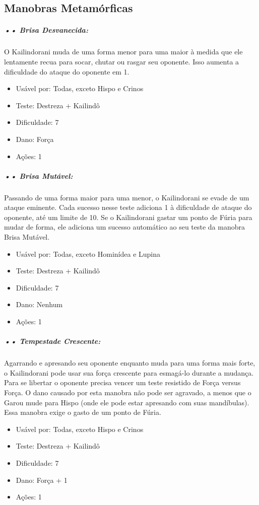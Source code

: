 \subsection{\bf Manobras Metamórficas}

\subparagraph{\bf •• Brisa Desvanecida:}
O Kailindorani muda de uma forma menor para uma maior à medida que ele lentamente recua para socar, chutar ou rasgar seu oponente. Isso aumenta a dificuldade do ataque do oponente em 1. 
\begin{itemize}[noitemsep]
\item Usável por: Todas, exceto Hispo e Crinos
\item Teste: Destreza + Kailindô 
\item Dificuldade: 7
\item Dano: Força 
\item Ações: 1
\end{itemize}

\subparagraph{\bf •• Brisa Mutável:}
Passando de uma forma maior para uma menor, o Kailindorani se evade de um ataque eminente. Cada sucesso nesse teste adiciona 1 à dificuldade de ataque do oponente, até um limite de 10. Se o Kailindorani gastar um ponto de Fúria para mudar de forma, ele adiciona um sucesso automático ao seu teste da manobra Brisa Mutável.
\begin{itemize}[noitemsep]
\item Usável por: Todas, exceto Hominídea e Lupina
\item Teste: Destreza + Kailindô 
\item Dificuldade: 7
\item Dano: Nenhum 
\item Ações: 1
\end{itemize}

\subparagraph{\bf •• Tempestade Crescente:}
Agarrando e apresando seu oponente enquanto muda para uma forma mais forte, o Kailindorani pode usar sua força crescente para esmagá-lo durante a mudança. Para se libertar o oponente precisa vencer um teste resistido de Força versus Força. O dano causado por esta manobra não pode ser agravado, a menos que o Garou mude para Hispo (onde ele pode estar apresando com suas mandíbulas). Essa manobra exige o gasto de um ponto de Fúria.
\begin{itemize}[noitemsep]
\item Usável por: Todas, exceto Hispo e Crinos
\item Teste: Destreza + Kailindô 
\item Dificuldade: 7
\item Dano: Força + 1 
\item Ações: 1
\end{itemize}

